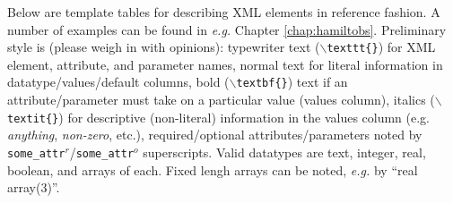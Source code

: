 Below are template tables for describing XML elements in reference fashion.  A number of examples can be found in \textit{e.g.} Chapter \ref{chap:hamiltobs}.  Preliminary style is (please weigh in with opinions): typewriter text ($\backslash$\texttt{texttt\{\}}) for XML element, attribute, and parameter names, normal text for literal information in datatype/values/default columns, bold ($\backslash$\texttt{textbf\{\}}) text if an attribute/parameter must take on a particular value (values column), italics ($\backslash$\texttt{textit\{\}}) for descriptive (non-literal) information in the values column (e.g. \textit{anything}, \textit{non-zero}, etc.), required/optional attributes/parameters noted by \texttt{some\_attr$^r$}/\texttt{some\_attr$^o$} superscripts.  Valid datatypes are text, integer, real, boolean, and arrays of each.  Fixed lengh arrays can be noted, \textit{e.g.} by ``real array(3)''.


